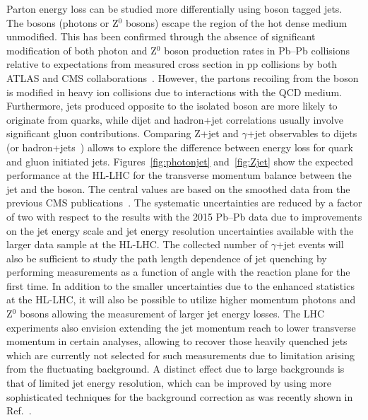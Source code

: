 Parton energy loss can be studied more differentially using boson tagged jets. The bosons (photons or Z$^{0}$ bosons) escape the region of the hot dense medium unmodified. This has been confirmed through the absence of significant modification of both photon and Z$^{0}$ boson production rates in Pb--Pb collisions relative to expectations from measured cross section in pp collisions by both ATLAS and CMS collaborations~\cite{Aad:2012ew,Aad:2015lcb,Chatrchyan:2012vq,Chatrchyan:2014csa}. However, the partons recoiling from the boson is modified in heavy ion collisions due to interactions with the QCD medium. Furthermore, jets produced opposite to the isolated boson
are more likely to originate from quarks, while dijet and hadron+jet correlations usually involve significant gluon contributions. 
Comparing Z+jet and $\gamma$+jet observables to dijets~\cite{Chatrchyan:2011sx,Chatrchyan:2012nia} (or hadron+jets~\cite{Adam:2015doa}) allows to explore the difference between energy loss for quark and gluon initiated jets. Figures~\ref{fig:photonjet} and~\ref{fig:Zjet} show the expected performance at the HL-LHC for the transverse momentum balance between the jet and the boson. The central values are based on the smoothed data from the previous CMS publications~\cite{Sirunyan:2017jic,Sirunyan:2017qhf}. The systematic uncertainties are reduced by a factor of two with respect to the results with the 2015 Pb--Pb data due to improvements on the jet energy scale and jet energy resolution uncertainties available with the larger data sample at the HL-LHC. The collected number of $\gamma$+jet events will also be sufficient to study the path length dependence of jet quenching by performing measurements as a function of angle with the reaction plane for the first time. In addition to the smaller uncertainties due to the enhanced statistics at the HL-LHC, it will also be possible to utilize higher momentum photons and Z$^{0}$ bosons allowing the measurement of larger jet energy losses. The LHC experiments also envision extending the jet momentum reach to lower transverse momentum in certain analyses, allowing to recover those heavily quenched jets which are currently not selected for such measurements due to limitation arising from the fluctuating background. A distinct effect due to large backgrounds is that of limited jet energy resolution, which can be improved by using more sophisticated techniques for the background correction as was recently shown in Ref.~\cite{Haake:2018hqn}.


